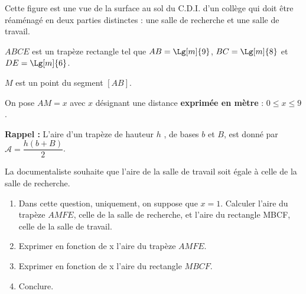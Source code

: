 \begin{exercice*}
    Cette figure est une vue de la surface au sol du C.D.I. d'un collège qui doit être réaménagé
    en deux parties distinctes : une salle de recherche et une salle de travail.

    $ABCE$ est un trapèze rectangle tel que $AB=\Lg[m]{9}$, $BC=\Lg[m]{8}$ et $DE=\Lg[m]{6}$.

    $M$ est un point du segment $[AB]$. 
    
    On pose $AM=x$ avec $x$ désignant une distance \textbf{exprimée en mètre} : $0\leq x \leq 9$.


    \textbf{Rappel :} L'aire d'un trapèze de hauteur $h$ , de bases $b$ et $B$, est donné par $\mathcal{A}=\dfrac{h(b+B)}{2}$.

    La documentaliste souhaite que l'aire de la salle de travail soit égale à celle de la salle de recherche.
    \begin{enumerate}
        \item Dans cette question, uniquement, on suppose que $x=1$. Calculer l'aire du trapèze $AMFE$, celle de la salle de
        recherche, et l'aire du rectangle MBCF, celle de la salle de travail.
        \item Exprimer en fonction de x l'aire du trapèze $AMFE$.
        \item Exprimer en fonction de x l'aire du rectangle $MBCF$.
        \item Conclure.
    \end{enumerate}
\end{exercice*}
